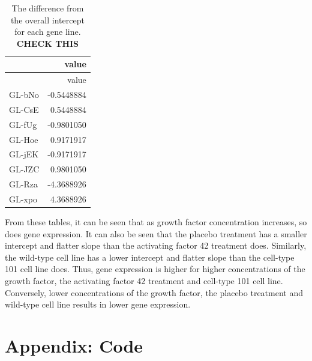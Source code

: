 \documentclass[
  letterpaper,
  DIV=11,
  numbers=noendperiod]{scrartcl}
\begin{document}
\hypertarget{tbl-random-coefs-m4}{}
\begin{longtable}[]{@{}lr@{}}
\caption{\label{tbl-random-coefs-m4}The difference from the overall
intercept for each gene line. \textbf{CHECK THIS}}\tabularnewline
\toprule()
& value \\
\midrule()
\endfirsthead
\toprule()
& value \\
\midrule()
\endhead
GL-bNo & -0.5448884 \\
GL-CsE & 0.5448884 \\
GL-fUg & -0.9801050 \\
GL-Hoe & 0.9171917 \\
GL-jEK & -0.9171917 \\
GL-JZC & 0.9801050 \\
GL-Rza & -4.3688926 \\
GL-xpo & 4.3688926 \\
\bottomrule()
\end{longtable}

From these tables, it can be seen that as growth factor concentration
increases, so does gene expression. It can also be seen that the placebo
treatment has a smaller intercept and flatter slope than the activating
factor 42 treatment does. Similarly, the wild-type cell line has a lower
intercept and flatter slope than the cell-type 101 cell line does. Thus,
gene expression is higher for higher concentrations of the growth
factor, the activating factor 42 treatment and cell-type 101 cell line.
Conversely, lower concentrations of the growth factor, the placebo
treatment and wild-type cell line results in lower gene expression.

\hypertarget{appendix-code}{%
\section{Appendix: Code}\label{appendix-code}}
\end{document}
